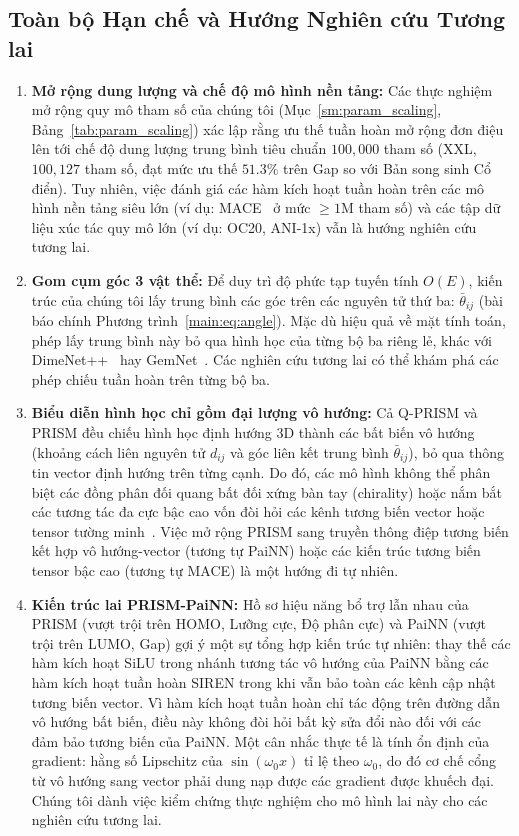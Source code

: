 \documentclass[10pt,twocolumn,letterpaper]{article}
\begin{document}
\subsection{Toàn bộ Hạn chế và Hướng Nghiên cứu Tương lai}

\begin{enumerate}
    \item \textbf{Mở rộng dung lượng và chế độ mô hình nền tảng:} Các thực nghiệm mở rộng quy mô tham số của chúng tôi (Mục~\ref{sm:param_scaling}, Bảng~\ref{tab:param_scaling}) xác lập rằng ưu thế tuần hoàn mở rộng đơn điệu lên tới chế độ dung lượng trung bình tiêu chuẩn $100{,}000$ tham số (XXL, $100{,}127$ tham số, đạt mức ưu thế $51.3\%$ trên Gap so với Bản song sinh Cổ điển). Tuy nhiên, việc đánh giá các hàm kích hoạt tuần hoàn trên các mô hình nền tảng siêu lớn (ví dụ: MACE~\cite{batatiaMACEHigherOrder2022} ở mức $\ge 1\mathrm{M}$ tham số) và các tập dữ liệu xúc tác quy mô lớn (ví dụ: OC20, ANI-1x) vẫn là hướng nghiên cứu tương lai.
    \item \textbf{Gom cụm góc 3 vật thể:} Để duy trì độ phức tạp tuyến tính $O(E)$, kiến trúc của chúng tôi lấy trung bình các góc trên các nguyên tử thứ ba: $\bar{\theta}_{ij}$ (bài báo chính Phương trình~\ref{main:eq:angle}). Mặc dù hiệu quả về mặt tính toán, phép lấy trung bình này bỏ qua hình học của từng bộ ba riêng lẻ, khác với DimeNet++~\cite{klicperaFastUncertaintyAwareDirectional2020} hay GemNet~\cite{klicperaGemNetUniversalDirectional2021}. Các nghiên cứu tương lai có thể khám phá các phép chiếu tuần hoàn trên từng bộ ba.
    \item \textbf{Biểu diễn hình học chỉ gồm đại lượng vô hướng:} Cả Q-PRISM và PRISM đều chiếu hình học định hướng 3D thành các bất biến vô hướng (khoảng cách liên nguyên tử $d_{ij}$ và góc liên kết trung bình $\bar{\theta}_{ij}$), bỏ qua thông tin vector định hướng trên từng cạnh. Do đó, các mô hình không thể phân biệt các đồng phân đối quang bất đối xứng bàn tay (chirality) hoặc nắm bắt các tương tác đa cực bậc cao vốn đòi hỏi các kênh tương biến vector hoặc tensor tường minh~\cite{schuttEquivariantMessagePassing2021, batatiaMACEHigherOrder2022}. Việc mở rộng PRISM sang truyền thông điệp tương biến kết hợp vô hướng-vector (tương tự PaiNN) hoặc các kiến trúc tương biến tensor bậc cao (tương tự MACE) là một hướng đi tự nhiên.
    \item \textbf{Kiến trúc lai PRISM-PaiNN:} Hồ sơ hiệu năng bổ trợ lẫn nhau của PRISM (vượt trội trên HOMO, Lưỡng cực, Độ phân cực) và PaiNN (vượt trội trên LUMO, Gap) gợi ý một sự tổng hợp kiến trúc tự nhiên: thay thế các hàm kích hoạt SiLU trong nhánh tương tác vô hướng của PaiNN bằng các hàm kích hoạt tuần hoàn SIREN trong khi vẫn bảo toàn các kênh cập nhật tương biến vector. Vì hàm kích hoạt tuần hoàn chỉ tác động trên đường dẫn vô hướng bất biến, điều này không đòi hỏi bất kỳ sửa đổi nào đối với các đảm bảo tương biến của PaiNN. Một cân nhắc thực tế là tính ổn định của gradient: hằng số Lipschitz của $\sin(\omega_0 x)$ tỉ lệ theo $\omega_0$, do đó cơ chế cổng từ vô hướng sang vector phải dung nạp được các gradient được khuếch đại. Chúng tôi dành việc kiểm chứng thực nghiệm cho mô hình lai này cho các nghiên cứu tương lai.

\end{enumerate}
\end{document}
